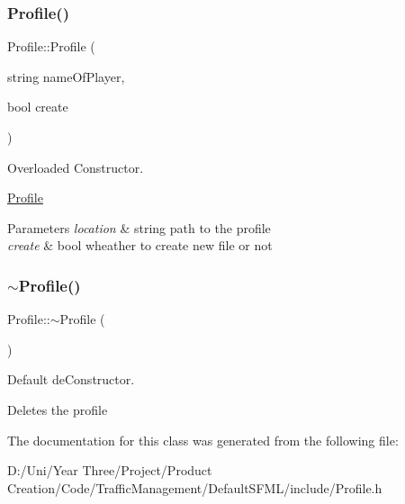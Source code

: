 \subsubsection{\texorpdfstring{Profile()}{Profile()}\hspace{0.1cm}{\footnotesize\ttfamily [3/3]}}
{\footnotesize\ttfamily Profile\+::\+Profile (\begin{DoxyParamCaption}\item[{string}]{name\+Of\+Player,  }\item[{bool}]{create }\end{DoxyParamCaption})}



Overloaded Constructor. 

\hyperlink{class_profile}{Profile}


\begin{DoxyParams}{Parameters}
{\em location} & string path to the profile \\
\hline
{\em create} & bool wheather to create new file or not \\
\hline
\end{DoxyParams}
\hypertarget{class_profile_a58fa758a59bc4ee3c1a9980e360e4e98}{}\label{class_profile_a58fa758a59bc4ee3c1a9980e360e4e98} 
\subsubsection{\texorpdfstring{$\sim$\+Profile()}{~Profile()}}
{\footnotesize\ttfamily Profile\+::$\sim$\+Profile (\begin{DoxyParamCaption}{ }\end{DoxyParamCaption})}



Default de\+Constructor. 

Deletes the profile 

The documentation for this class was generated from the following file\+:\begin{DoxyCompactItemize}
\item 
D\+:/\+Uni/\+Year Three/\+Project/\+Product Creation/\+Code/\+Traffic\+Management/\+Default\+S\+F\+M\+L/include/Profile.\+h\end{DoxyCompactItemize}
